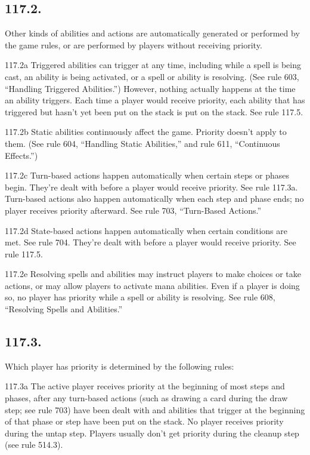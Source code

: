 \subsection*{117.2.}
Other kinds of abilities and actions are automatically generated or performed by the game rules, or are performed by players without receiving priority.

117.2a Triggered abilities can trigger at any time, including while a spell is being cast, an ability is being activated, or a spell or ability is resolving. (See rule 603, “Handling Triggered Abilities.”) However, nothing actually happens at the time an ability triggers. Each time a player would receive priority, each ability that has triggered but hasn’t yet been put on the stack is put on the stack. See rule 117.5.

117.2b Static abilities continuously affect the game. Priority doesn’t apply to them. (See rule 604, “Handling Static Abilities,” and rule 611, “Continuous Effects.”)

117.2c Turn-based actions happen automatically when certain steps or phases begin. They’re dealt with before a player would receive priority. See rule 117.3a. Turn-based actions also happen automatically when each step and phase ends; no player receives priority afterward. See rule 703, “Turn-Based Actions.”

117.2d State-based actions happen automatically when certain conditions are met. See rule 704. They’re dealt with before a player would receive priority. See rule 117.5.

117.2e Resolving spells and abilities may instruct players to make choices or take actions, or may allow players to activate mana abilities. Even if a player is doing so, no player has priority while a spell or ability is resolving. See rule 608, “Resolving Spells and Abilities.”

\subsection*{117.3.}
Which player has priority is determined by the following rules:

117.3a The active player receives priority at the beginning of most steps and phases, after any turn-based actions (such as drawing a card during the draw step; see rule 703) have been dealt with and abilities that trigger at the beginning of that phase or step have been put on the stack. No player receives priority during the untap step. Players usually don’t get priority during the cleanup step (see rule 514.3).

